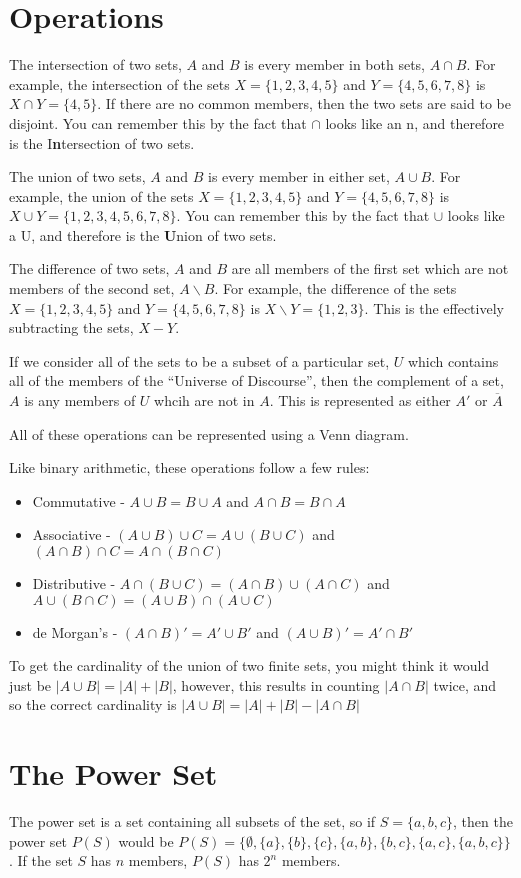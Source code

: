 \section*{Operations}

The intersection of two sets, $A$ and $B$ is every member in both sets, $A \cap B$. For example, the intersection of the
 sets $X = \{1, 2, 3, 4, 5\}$ and $Y = \{4, 5, 6, 7, 8\}$ is $X \cap Y = \{4, 5\}$. If there are no common members, then
 the two sets are said to be disjoint. You can remember this by the fact that $\cap$ looks like an n, and therefore is
 the I\textbf{n}tersection of two sets.

The union of two sets, $A$ and $B$ is every member in either set, $A \cup B$. For example, the union of the sets
 $X = \{1, 2, 3, 4, 5\}$ and $Y = \{4, 5, 6, 7, 8\}$ is $X \cup Y = \{1, 2, 3, 4, 5, 6, 7, 8\}$. You can remember this
 by the fact that $\cup$ looks like a U, and therefore is the \textbf{U}nion of two sets.

The difference of two sets, $A$ and $B$ are all members of the first set which are not members of the second set,
 $A \backslash B$. For example, the difference of the sets $X = \{1, 2, 3, 4, 5\}$ and $Y = \{4, 5, 6, 7, 8\}$ is
 $X \backslash Y = \{1, 2, 3\}$. This is the effectively subtracting the sets, $X - Y$.

If we consider all of the sets to be a subset of a particular set, $U$ which contains all of the members of the
 ``Universe of Discourse'', then the complement of a set, $A$ is any members of $U$ whcih are not in $A$. This is
  represented as either $A'$ or $\overline{A}$

All of these operations can be represented using a Venn diagram.

Like binary arithmetic, these operations follow a few rules:
\begin{itemize}
  \item Commutative - $A \cup B = B \cup A$ and $A \cap B = B \cap A$
  \item Associative - $(A \cup B) \cup C = A \cup (B \cup C)$ and $(A \cap B) \cap C = A \cap (B \cap C)$
  \item Distributive - $A \cap (B \cup C) = (A \cap B) \cup (A \cap C)$ and
   $A \cup (B \cap C) = (A \cup B) \cap (A \cup C)$
  \item de Morgan's - $(A \cap B)' = A' \cup B'$ and $(A \cup B)' = A' \cap B'$
\end{itemize}

To get the cardinality of the union of two finite sets, you might think it would just be
 $\lvert A \cup B \rvert = \lvert A \rvert + \lvert B \rvert$, however, this results in counting $\lvert A \cap B \rvert$
 twice, and so the correct cardinality is $\lvert A \cup B \rvert = \lvert A \rvert + \lvert B \rvert - \lvert A \cap B \rvert$

\section*{The Power Set}

The power set is a set containing all subsets of the set, so if $S = \{a, b, c\}$, then the power set $P(S)$ would be
 $P(S) = \{\emptyset, \{a\}, \{b\}, \{c\}, \{a, b\}, \{b, c\}, \{a, c\}, \{a, b, c\}\}$. If the set $S$ has $n$ members,
 $P(S)$ has $2^n$ members.